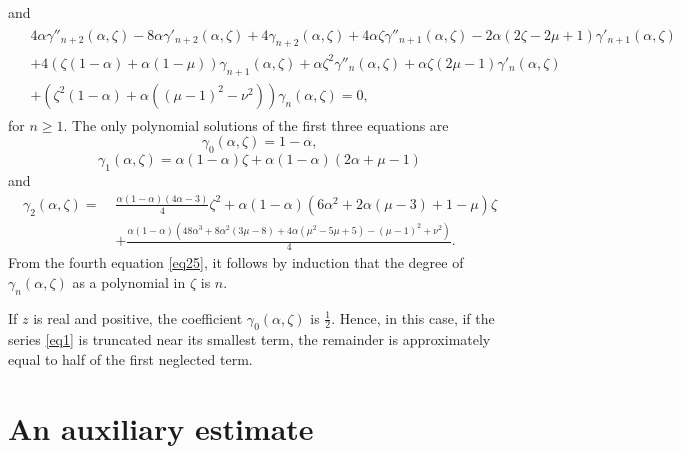 \documentclass[a4paper,twoside,10pt]{amsart}
\numberwithin{equation}{section}
\begin{document}
and
\begin{gather}\label{eq25}
\begin{split}
& 4\alpha \gamma ''_{n + 2} \left( {\alpha ,\zeta } \right) - 8\alpha \gamma '_{n + 2} \left( {\alpha ,\zeta } \right) + 4\gamma _{n + 2} \left( {\alpha ,\zeta } \right) + 4\alpha \zeta \gamma ''_{n + 1} \left( {\alpha ,\zeta } \right) - 2\alpha \left( {2\zeta  - 2\mu  + 1} \right)\gamma '_{n + 1} \left( {\alpha ,\zeta } \right)\\ & + 4\left( {\zeta \left( {1 - \alpha } \right) + \alpha \left( {1 - \mu } \right)} \right)\gamma _{n + 1} \left( {\alpha ,\zeta } \right) + \alpha \zeta ^2 \gamma ''_n \left( {\alpha ,\zeta } \right) + \alpha \zeta \left( {2\mu  - 1} \right)\gamma '_n \left( {\alpha ,\zeta } \right) \\ & + \left( {\zeta ^2 \left( {1 - \alpha } \right) + \alpha \left( {\left( {\mu  - 1} \right)^2  - \nu ^2 } \right)} \right)\gamma _n \left( {\alpha ,\zeta } \right) =0,
\end{split}
\end{gather}
for $n\geq 1$. The only polynomial solutions of the first three equations are
\[
\gamma _0 \left( {\alpha ,\zeta } \right) = 1 - \alpha ,
\]
\[
\gamma _1 \left( {\alpha ,\zeta } \right) = \alpha \left( {1 - \alpha } \right)\zeta  + \alpha \left( {1 - \alpha } \right)\left( {2\alpha  + \mu  - 1} \right)
\]
and
\begin{align*}
\gamma _2 \left( {\alpha ,\zeta } \right) = \; & \frac{{\alpha \left( {1 - \alpha } \right)\left( {4\alpha  - 3} \right)}}{4}\zeta ^2  + \alpha \left( {1 - \alpha } \right)\left( {6\alpha ^2  + 2\alpha \left( {\mu  - 3} \right) + 1 - \mu } \right)\zeta \\ & + \frac{{\alpha \left( {1 - \alpha } \right)\left( {48\alpha ^3  + 8\alpha ^2 \left( {3\mu  - 8} \right) + 4\alpha \left( {\mu ^2  - 5\mu  + 5} \right) - \left( {\mu  - 1} \right)^2  + \nu ^2 } \right)}}{4}.
\end{align*}
From the fourth equation \eqref{eq25}, it follows by induction that the degree of $\gamma_n \left( {\alpha ,\zeta } \right)$ as a polynomial in $\zeta$ is $n$.

If $z$ is real and positive, the coefficient $\gamma _0 \left( {\alpha ,\zeta } \right)$ is $\frac{1}{2}$. Hence, in this case, if the series \eqref{eq1} is truncated near its smallest term, the remainder is approximately equal to half of the first neglected term.

\section{An auxiliary estimate}\label{appendixb}
\end{document}
